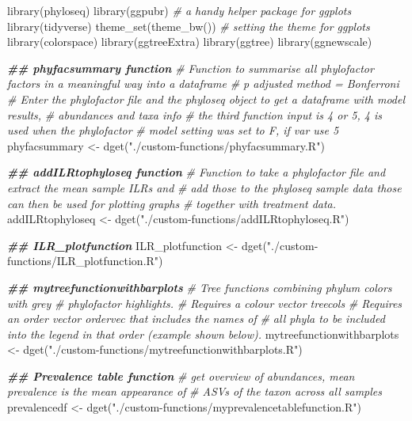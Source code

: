 \documentclass[
]{book}
\newenvironment{Shaded}{\begin{snugshade}}{\end{snugshade}}
\newcommand{\CommentTok}[1]{\textcolor[rgb]{0.56,0.35,0.01}{\textit{#1}}}
\newcommand{\DocumentationTok}[1]{\textcolor[rgb]{0.56,0.35,0.01}{\textbf{\textit{#1}}}}
\newcommand{\FunctionTok}[1]{\textcolor[rgb]{0.00,0.00,0.00}{#1}}
\newcommand{\NormalTok}[1]{#1}
\newcommand{\OtherTok}[1]{\textcolor[rgb]{0.56,0.35,0.01}{#1}}
\newcommand{\StringTok}[1]{\textcolor[rgb]{0.31,0.60,0.02}{#1}}
\begin{document}
\begin{Shaded}
\begin{Highlighting}[]
\FunctionTok{library}\NormalTok{(phyloseq)}
\FunctionTok{library}\NormalTok{(ggpubr)       }\CommentTok{\# a handy helper package for ggplots}
\FunctionTok{library}\NormalTok{(tidyverse)}
\FunctionTok{theme\_set}\NormalTok{(}\FunctionTok{theme\_bw}\NormalTok{())  }\CommentTok{\# setting the theme for ggplots}
\FunctionTok{library}\NormalTok{(colorspace)}
\FunctionTok{library}\NormalTok{(ggtreeExtra)}
\FunctionTok{library}\NormalTok{(ggtree)}
\FunctionTok{library}\NormalTok{(ggnewscale)}
 
\DocumentationTok{\#\# phyfacsummary function }
\CommentTok{\# Function to summarise all phylofactor factors in a meaningful way into a dataframe}
\CommentTok{\# p adjusted method = Bonferroni}
\CommentTok{\# Enter the phylofactor file and the phyloseq object to get a dataframe with model results, }
\CommentTok{\# abundances and taxa info}
\CommentTok{\# the third function input is \textquotesingle{}4\textquotesingle{} or \textquotesingle{}5\textquotesingle{},  4 is used when the phylofactor }
\CommentTok{\# model setting was set to \textquotesingle{}F\textquotesingle{}, if \textquotesingle{}var\textquotesingle{} use 5}
\NormalTok{phyfacsummary }\OtherTok{\textless{}{-}} \FunctionTok{dget}\NormalTok{(}\StringTok{"./custom{-}functions/phyfacsummary.R"}\NormalTok{)}

\DocumentationTok{\#\# addILRtophyloseq function }
\CommentTok{\# Function to take a phylofactor file and extract the mean sample ILRs and }
\CommentTok{\# add those to the phyloseq sample data those can then be used for plotting graphs }
\CommentTok{\# together with treatment data. }
\NormalTok{addILRtophyloseq }\OtherTok{\textless{}{-}} \FunctionTok{dget}\NormalTok{(}\StringTok{"./custom{-}functions/addILRtophyloseq.R"}\NormalTok{)}

\DocumentationTok{\#\# ILR\_plotfunction}
\NormalTok{ILR\_plotfunction }\OtherTok{\textless{}{-}} \FunctionTok{dget}\NormalTok{(}\StringTok{"./custom{-}functions/ILR\_plotfunction.R"}\NormalTok{)}

\DocumentationTok{\#\# mytreefunctionwithbarplots}
\CommentTok{\# Tree functions combining phylum colors with grey }
\CommentTok{\# phylofactor highlights. }
\CommentTok{\# Requires a colour vector \textquotesingle{}treecols\textquotesingle{}}
\CommentTok{\# Requires an order vector \textquotesingle{}ordervec\textquotesingle{} that includes the names of }
\CommentTok{\# all phyla to be included into the legend in that order (example shown below). }
\NormalTok{mytreefunctionwithbarplots }\OtherTok{\textless{}{-}} \FunctionTok{dget}\NormalTok{(}\StringTok{"./custom{-}functions/mytreefunctionwithbarplots.R"}\NormalTok{)}

\DocumentationTok{\#\# Prevalence table function}
\CommentTok{\# get overview of abundances, mean prevalence is the mean \textquotesingle{}appearance\textquotesingle{} of }
\CommentTok{\# ASVs of the taxon across all samples}
\NormalTok{prevalencedf }\OtherTok{\textless{}{-}} \FunctionTok{dget}\NormalTok{(}\StringTok{"./custom{-}functions/myprevalencetablefunction.R"}\NormalTok{)}
\end{Highlighting}
\end{Shaded}
\end{document}
